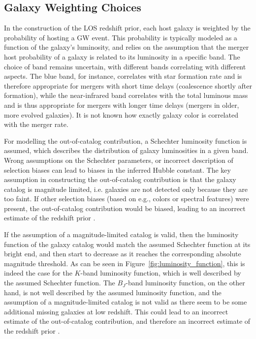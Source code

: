 \subsection{Galaxy Weighting Choices}
In the construction of the \ac{LOS} redshift prior, each host galaxy is weighted by the probability of hosting a \ac{GW} event. This probability is typically modeled as a function of the galaxy's luminosity, and relies on the assumption that the merger host probability of a galaxy is related to its luminosity in a specific band. The choice of band remains uncertain, with different bands correlating with different aspects. The blue band, for instance, correlates with star formation rate and is therefore appropriate for mergers with short time delays (coalescence shortly after formation), while the near-infrared band correlates with the total luminous mass and is thus appropriate for mergers with longer time delays (mergers in older, more evolved galaxies). It is not known how exactly galaxy color is correlated with the merger rate.

For modelling the out-of-catalog contribution, a Schechter luminosity function is assumed, which describes the distribution of galaxy luminosities in a given band. Wrong assumptions on the Schechter parameters, or incorrect description of selection biases can lead to biases in the inferred Hubble constant. The key assumption in constructing the out-of-catalog contribution is that the galaxy catalog is magnitude limited, i.e. galaxies are not detected only because they are too faint. If other selection biases (based on e.g., colors or spectral features) were present, the out-of-catalog contribution would be biased, leading to an incorrect estimate of the redshift prior \citep{abbott2023constraints}. 

If the assumption of a magnitude-limited catalog is valid, then the luminosity function of the galaxy catalog would match the assumed Schechter function at its bright end, and then start to decrease as it reaches the corresponding absolute magnitude threshold. As can be seen in Figure~\ref{fig:luminosity_function}, this is indeed the case for the $K$-band luminosity function, which is well described by the assumed Schechter function. The $B_J$-band luminosity function, on the other hand, is not well described by the assumed luminosity function, and the assumption of a magnitude-limited catalog is not valid as there seem to be some additional missing galaxies at low redshift. This could lead to an incorrect estimate of the out-of-catalog contribution, and therefore an incorrect estimate of the redshift prior \citep{abbott2023constraints}.

